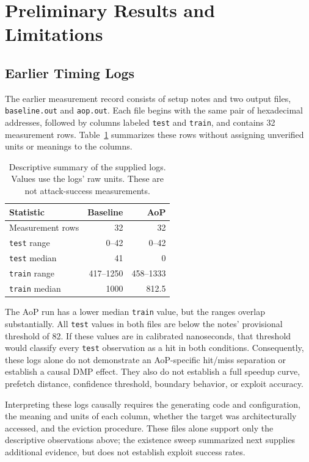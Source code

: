 \section{Preliminary Results and Limitations}
\subsection{Earlier Timing Logs}
The earlier measurement record consists of setup notes and two output files, \texttt{baseline.out} and \texttt{aop.out}. Each file begins with the same pair of hexadecimal addresses, followed by columns labeled \texttt{test} and \texttt{train}, and contains 32 measurement rows. Table~\ref{tab:logs} summarizes these rows without assigning unverified units or meanings to the columns.

\begin{table}[t]
\caption{Descriptive summary of the supplied logs. Values use the logs' raw units. These are not attack-success measurements.}
\label{tab:logs}
\centering
\begin{tabular}{lrr}
\toprule
Statistic & Baseline & AoP \\
\midrule
Measurement rows & 32 & 32 \\
\texttt{test} range & 0--42 & 0--42 \\
\texttt{test} median & 41 & 0 \\
\texttt{train} range & 417--1250 & 458--1333 \\
\texttt{train} median & 1000 & 812.5 \\
\bottomrule
\end{tabular}
\end{table}

The AoP run has a lower median \texttt{train} value, but the ranges overlap substantially. All \texttt{test} values in both files are below the notes' provisional threshold of 82. If these values are in calibrated nanoseconds, that threshold would classify every \texttt{test} observation as a hit in both conditions. Consequently, these logs alone do not demonstrate an AoP-specific hit/miss separation or establish a causal DMP effect. They also do not establish a full speedup curve, prefetch distance, confidence threshold, boundary behavior, or exploit accuracy.

Interpreting these logs causally requires the generating code and configuration, the meaning and units of each column, whether the target was architecturally accessed, and the eviction procedure. These files alone support only the descriptive observations above; the existence sweep summarized next supplies additional evidence, but does not establish exploit success rates.


